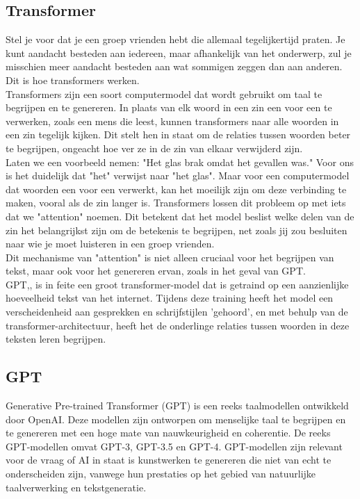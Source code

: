 \subsection{Transformer}
Stel je voor dat je een groep vrienden hebt die allemaal tegelijkertijd praten. Je kunt aandacht besteden aan iedereen, maar afhankelijk van het onderwerp, zul je misschien meer aandacht besteden aan wat sommigen zeggen dan aan anderen. Dit is hoe transformers werken. \\

Transformers zijn een soort computermodel dat wordt gebruikt om taal te begrijpen en te genereren. In plaats van elk woord in een zin een voor een te verwerken, zoals een mens die leest, kunnen transformers naar alle woorden in een zin tegelijk kijken. Dit stelt hen in staat om de relaties tussen woorden beter te begrijpen, ongeacht hoe ver ze in de zin van elkaar verwijderd zijn. \\

Laten we een voorbeeld nemen: "Het glas brak omdat het gevallen was." Voor ons is het duidelijk dat "het" verwijst naar "het glas". Maar voor een computermodel dat woorden een voor een verwerkt, kan het moeilijk zijn om deze verbinding te maken, vooral als de zin langer is. Transformers lossen dit probleem op met iets dat we "attention" noemen. Dit betekent dat het model beslist welke delen van de zin het belangrijkst zijn om de betekenis te begrijpen, net zoals jij zou besluiten naar wie je moet luisteren in een groep vrienden.\\ 

Dit mechanisme van "attention" is niet alleen cruciaal voor het begrijpen van tekst, maar ook voor het genereren ervan, zoals in het geval van GPT. \\

GPT,, is in feite een groot transformer-model dat is getraind op een aanzienlijke hoeveelheid tekst van het internet. Tijdens deze training heeft het model een verscheidenheid aan gesprekken en schrijfstijlen 'gehoord', en met behulp van de transformer-architectuur, heeft het de onderlinge relaties tussen woorden in deze teksten leren begrijpen. \\

\subsection{GPT}
Generative Pre-trained Transformer (GPT) is een reeks taalmodellen ontwikkeld door OpenAI. Deze modellen zijn ontworpen om menselijke taal te begrijpen en te genereren met een hoge mate van nauwkeurigheid en coherentie. De reeks GPT-modellen omvat GPT-3, GPT-3.5 en GPT-4. GPT-modellen zijn relevant voor de vraag of AI in staat is kunstwerken te genereren die niet van echt te onderscheiden zijn, vanwege hun prestaties op het gebied van natuurlijke taalverwerking en tekstgeneratie. \\

